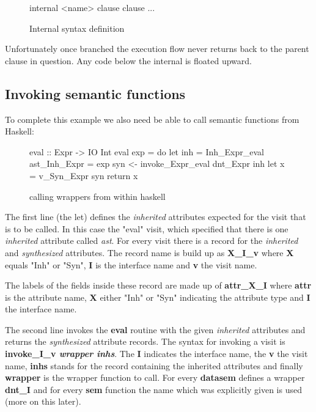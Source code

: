 \begin{figure}[h!]
\begin{code}
internal <name>
  {clause}
  {clause}
  ...
\end{code}
\caption{Internal syntax definition}
\label{internal:syntax}
\end{figure}

Unfortunately once branched the execution flow never returns back to the parent clause in question. Any code below the internal is floated upward.

\subsection{Invoking semantic functions}
To complete this example we also need be able to call semantic functions from Haskell:

\begin{figure}[H]
\begin{code}
eval :: Expr -> IO Int
eval exp = do
  let inh = Inh_Expr_eval { ast_Inh_Expr = exp }
  syn <- invoke_Expr_eval dnt_Expr inh
  let x = v_Syn_Expr syn
  return x
\end{code}
\caption{calling wrappers from within haskell}
\end{figure}

The first line (the let) defines the \emph{inherited} attributes expected for the visit that is to be called. In this case the "eval" visit, which specified that there is one \emph{inherited} attribute called \emph{ast}. For every visit there is a record for the \emph{inherited} and \emph{synthesized} attributes. The record name is build up as \textbf{X\_I\_v} where \textbf{X} equals "Inh" or "Syn", \textbf{I} is the interface name and \textbf{v} the visit name.

The labels of the fields inside these record are made up of \textbf{attr\_X\_I} where \textbf{attr} is the attribute name, \textbf{X} either "Inh" or "Syn" indicating the attribute type and \textbf{I} the interface name.

The second line invokes the \textbf{eval} routine with the given \emph{inherited} attributes and returns the \emph{synthesized} attribute records. The syntax for invoking a visit is \textbf{invoke\_I\_v \emph{wrapper inhs}}. The \textbf{I} indicates the interface name, the \textbf{v} the visit name, \textbf{inhs} stands for the record containing the inherited attributes and finally \textbf{wrapper} is the wrapper function to call. For every \textbf{datasem} \rcore defines a wrapper \textbf{dnt\_I} and for every \textbf{sem} function the name which was explicitly given is used (more on this later).

